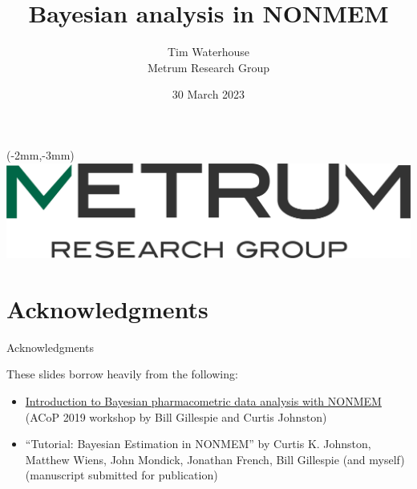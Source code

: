 \documentclass{beamer}
\title[Bayesian analysis in NONMEM]{Bayesian analysis in NONMEM}
\author{Tim Waterhouse\\
Metrum Research Group}
\date{30 March 2023}
\begin{document}
 
\begin{frame}

\begin{textblock*}{80mm}(-2mm,-3mm)
\includegraphics[scale=0.2]{graphics/metrum_new_logo.png}
\end{textblock*}




\titlepage



\end{frame}

\section{Acknowledgments}

\begin{frame}{Acknowledgments}

  These slides borrow heavily from the following:

  \begin{itemize}
    \item \href{https://metrumrg.com/course/introduction-to-bayesian-pharmacometric-data-analysis-with-nonmem/}{Introduction to Bayesian pharmacometric data analysis with NONMEM} (ACoP 2019 workshop by Bill Gillespie and Curtis Johnston)
    \item ``Tutorial: Bayesian Estimation in NONMEM'' by Curtis K. Johnston,
    Matthew Wiens,
    John Mondick,
    Jonathan French,
    Bill Gillespie (and myself)
     (manuscript submitted for publication)
  \end{itemize}
\end{frame}
\end{document}
